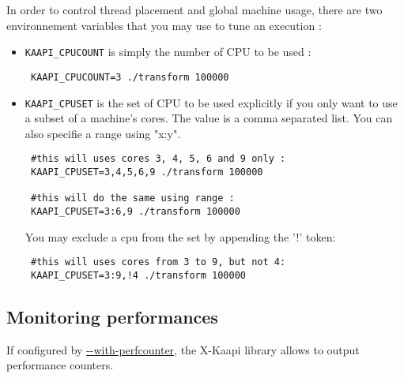 \documentclass{article}
\newcommand{\kaapi}{\textsc{X}-Kaapi\xspace}
\begin{document}
In order to control thread placement and global machine usage, there are two environnement variables that you may use to tune an execution :

\begin{itemize}
\item \verb+KAAPI_CPUCOUNT+ is simply the number of CPU to be used :

\begin{verbatim}
 KAAPI_CPUCOUNT=3 ./transform 100000
\end{verbatim}

\item \verb+KAAPI_CPUSET+ is the set of CPU to be used explicitly if you only want to use a subset of a machine's cores. The value is a comma separated list. You can also specifie a range using "x:y".

\begin{verbatim}
 #this will uses cores 3, 4, 5, 6 and 9 only :
 KAAPI_CPUSET=3,4,5,6,9 ./transform 100000
 
 #this will do the same using range :
 KAAPI_CPUSET=3:6,9 ./transform 100000
\end{verbatim}

You may exclude a cpu from the set by appending the '!' token:
\begin{verbatim}
 #this will uses cores from 3 to 9, but not 4:
 KAAPI_CPUSET=3:9,!4 ./transform 100000
\end{verbatim}

\end{itemize}

\subsection{Monitoring performances}
If configured by \url{--with-perfcounter}, the \kaapi library allows to output performance counters.
\end{document}
